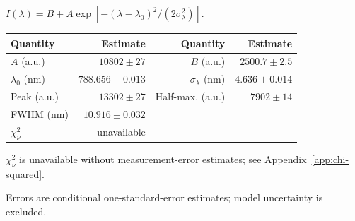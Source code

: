 \par\smallskip\begingroup\small
\setlength{\tabcolsep}{5pt}
\(I(\lambda)=B+A\exp[-(\lambda-\lambda_0)^2/(2\sigma_\lambda^2)].\)
\par\smallskip\begin{tabular}{lrrr}\toprule
Quantity & Estimate & Quantity & Estimate\\\midrule
$A$ (a.u.) & $10802\pm27$ & $B$ (a.u.) & $2500.7\pm2.5$\\
$\lambda_0$ (nm) & $788.656\pm0.013$ & $\sigma_\lambda$ (nm) & $4.636\pm0.014$\\
Peak (a.u.) & $13302\pm27$ & Half-max. (a.u.) & $7902\pm14$\\
FWHM (nm) & $10.916\pm0.032$ &  & \\
$\chi^2_\nu$ & unavailable &  & \\
\bottomrule\end{tabular}
\par\smallskip\noindent $\chi^2_\nu$ is unavailable without measurement-error estimates; see Appendix~\ref{app:chi-squared}.
\par\smallskip\noindent Errors are conditional one-standard-error estimates; model uncertainty is excluded.
\par\endgroup
